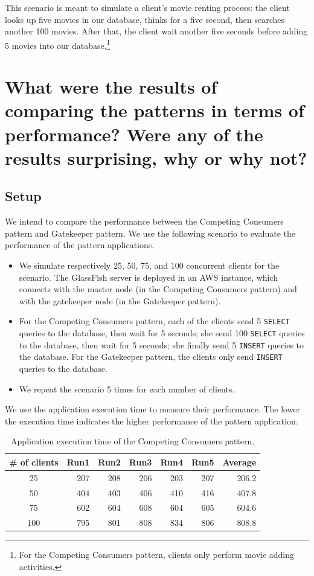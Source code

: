 \documentclass{article}
\begin{document}
This scenario is meant to simulate a client's movie renting process: the client looks up five movies in our database, thinks for a five second, then searches another 100 movies. After that, the client wait another five seconds before adding 5 movies into our database.\footnote{For the Competing Consumers pattern, clients only perform movie adding activities.}


\section{What were the results of comparing the patterns in terms of performance? Were any of the results surprising, why or why not?}\label{Q5}

\subsection{Setup}
We intend to compare the performance between the Competing Consumers pattern and Gatekeeper pattern. We use the following scenario to evaluate the performance of the pattern applications. 

\begin{itemize}
\item We simulate respectively 25, 50, 75, and 100 concurrent clients for the scenario. The GlassFish server is deployed in an AWS instance, which connects with the master node (in the Competing Consumers pattern) and with the gatekeeper node (in the Gatekeeper pattern).
\item For the Competing Consumers pattern, each of the clients send 5 \texttt{SELECT} queries to the database, then wait for 5 seconds; she send 100 \texttt{SELECT} queries to the database, then wait for 5 seconds; she finally send 5 \texttt{INSERT} queries to the database. For the Gatekeeper pattern, the clients only send \texttt{INSERT} queries to the database.
\item We repeat the scenario 5 times for each number of clients.
\end{itemize}

We use the application execution time to measure their performance. The lower the execution time indicates the higher performance of the pattern application.


\begin{table}[t]
    \centering
    \caption{Application execution time of the Competing Consumers pattern.}
    \label{tab:ccp_performance}
    \begin{tabular}{|c|r|r|r|r|r|r|}
        \hline
        \textbf{\# of clients} & \textbf{Run1} & \textbf{Run2} & \textbf{Run3} & \textbf{Run4} & \textbf{Run5} & \textbf{Average}\\ \hline
        25 & 207 & 208 & 206 & 203 & 207 & 206.2 \\ \hline 
        50 & 404 & 403 & 406 & 410 & 416 & 407.8 \\ \hline
        75 & 602 & 604 & 608 & 604 & 605 & 604.6 \\ \hline
        100 & 795 & 801 & 808 & 834 & 806 & 808.8 \\ \hline
	\end{tabular}
\end{table}
\end{document}
